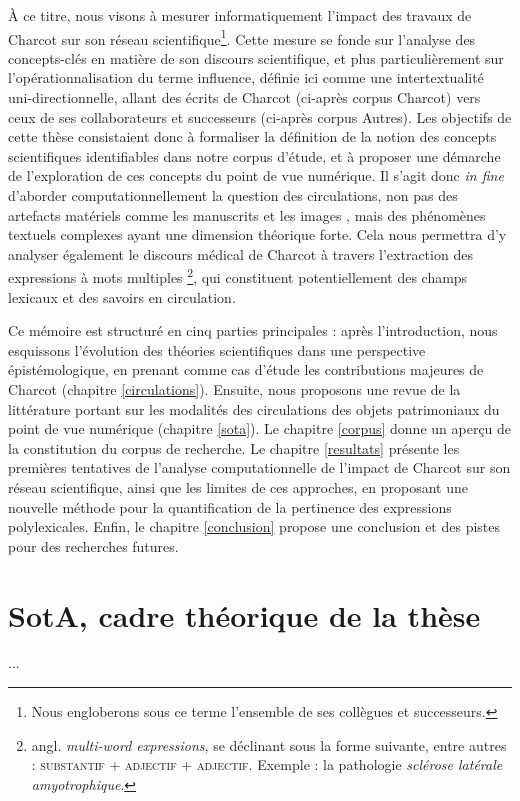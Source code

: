 À ce titre, nous visons à mesurer informatiquement l'impact des travaux de Charcot sur son réseau scientifique\footnote{Nous engloberons sous ce terme l'ensemble de ses collègues et successeurs.}. Cette mesure se fonde sur l'analyse des concepts-clés en matière de son discours scientifique, et plus particulièrement sur l'opérationnalisation du terme \og{}influence\fg{}, définie ici comme une intertextualité uni-directionnelle, allant des écrits de Charcot (ci-après corpus \og{}Charcot\fg{}) vers ceux de ses collaborateurs et successeurs (ci-après corpus \og{}Autres\fg{}). Les objectifs de cette thèse consistaient donc à formaliser la définition de la notion des concepts scientifiques identifiables dans notre corpus d'étude, et à proposer une démarche de l'exploration de ces concepts du point de vue numérique. Il s'agit donc \textit{in fine} d'aborder computationnellement la question des circulations, non pas des artefacts matériels comme les manuscrits \citep{gabay2021katabase} et les images \citep{joyeux2019visual}, mais des phénomènes textuels complexes \citep{manjavacas} ayant une dimension théorique forte. Cela nous permettra d'y analyser également le discours médical de Charcot à travers l'extraction des expressions à mots multiples \citep[p. 96]{nerima2006}\footnote{angl. \textit{multi-word expressions}, se déclinant sous la forme suivante, entre autres : \textsc{substantif + adjectif + adjectif}. Exemple : la pathologie \textit{sclérose latérale amyotrophique}.}, qui constituent potentiellement des champs lexicaux et des savoirs en circulation.

Ce mémoire est structuré en cinq parties principales : après l'introduction, nous esquissons l'évolution des théories scientifiques dans une perspective épistémologique, en prenant comme cas d'étude les contributions majeures de Charcot (chapitre \ref{circulations}).
Ensuite, nous proposons une revue de la littérature portant sur les modalités des circulations des objets patrimoniaux du point de vue numérique (chapitre \ref{sota}). Le chapitre \ref{corpus} donne un aperçu de la constitution du corpus de recherche. Le chapitre \ref{resultats} présente les premières tentatives de l'analyse computationnelle de l'impact de Charcot sur son réseau scientifique, ainsi que les limites de ces approches, en proposant une nouvelle méthode pour la quantification de la pertinence des expressions polylexicales. Enfin, le chapitre \ref{conclusion} propose une conclusion et des pistes pour des recherches futures.

\section{SotA, cadre théorique de la thèse}
...
